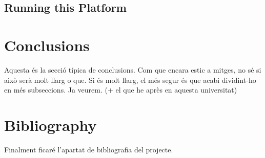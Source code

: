\documentclass[a4paper,12pt]{article}
\begin{document}
\subsection{Running this Platform}



\section{Conclusions}

Aquesta és la secció típica de conclusions. Com que encara estic a mitges, no
sé si això serà molt llarg o que. Si és molt llarg, el més segur és que acabi
dividint-ho en més subseccions. Ja veurem. (+ el que he après en aquesta
universitat)

\section{Bibliography}

Finalment ficaré l'apartat de bibliografia del projecte.
\end{document}
